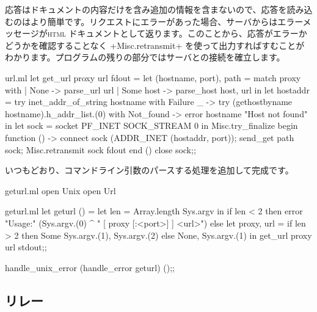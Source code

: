 応答はドキュメントの内容だけを含み追加の情報を含まないので、応答を読み込むのはより簡単です。リクエストにエラーがあった場合、サーバからはエラーメッセージが\textsc{html} ドキュメントとして返ります。このことから、応答がエラーかどうかを確認することなく \ml+Misc.retransmit+ を使って出力すればすむことがわかります。プログラムの残りの部分ではサーバとの接続を確立します。
%
\begin{listingcodefile}{url.ml}
let get_url proxy url fdout =
  let (hostname, port), path = match proxy with
    | None -> parse_url url
    | Some host -> parse_host host, url
  in
  let hostaddr =
    try inet_addr_of_string hostname
    with Failure _ ->
      try (gethostbyname hostname).h_addr_list.(0)
      with Not_found -> error hostname "Host not found"
  in
  let sock = socket PF_INET SOCK_STREAM 0 in
  Misc.try_finalize
    begin function () ->
      connect sock (ADDR_INET (hostaddr, port));
      send_get path sock;
      Misc.retransmit sock fdout
    end ()
    close sock;;
\end{listingcodefile}
%
いつもどおり、コマンドライン引数のパースする処理を追加して完成です。
%
\begin{codefile}{geturl.ml}
open Unix
open Url
\end{codefile}
%
\begin{listingcodefile}{geturl.ml}
let geturl () =
  let len =  Array.length Sys.argv in
  if len < 2 then
    error "Usage:" (Sys.argv.(0) ^ " [ proxy [:<port>] ] <url>")
  else
    let proxy, url =
      if len > 2 then Some Sys.argv.(1), Sys.argv.(2) else
      None, Sys.argv.(1)
    in
    get_url proxy url stdout;;

handle_unix_error (handle_error geturl) ();;
\end{listingcodefile}

\subsection*{\label{sec/relay}{\normalfont\http} リレー}

